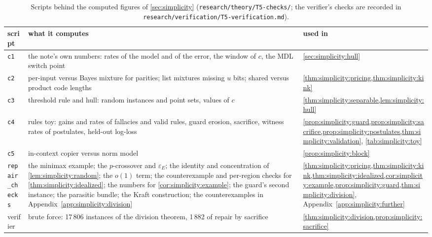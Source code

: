 \begin{table}[ht]
\centering\footnotesize
\begin{tabularx}{\textwidth}{@{}l>{\raggedright\arraybackslash}X>{\raggedright\arraybackslash}p{}@{}}
\toprule
script & what it computes & used in\\
\midrule
\texttt{c1} & the note's own numbers: rates of the model and of the error, the window of $c$, the MDL switch point & \cref{sec:simplicity:hull}\\
\texttt{c2} & per-input versus Bayes mixture for parities; list mixtures missing $u$ bits; shared versus product code lengths & \cref{thm:simplicity:pricing,thm:simplicity:kink}\\
\texttt{c3} & threshold rule and hull: random instances and point sets, values of $c$ & \cref{thm:simplicity:separable,lem:simplicity:hull}\\
\texttt{c4} & rules toy: gains and rates of fallacies and valid rules, guard erosion, sacrifice, witness rates of postulates, held-out log-loss & \cref{prop:simplicity:guard,prop:simplicity:sacrifice,prop:simplicity:postulates,thm:simplicity:validation}, \cref{tab:simplicity:toy}\\
\texttt{c5} & in-context copier versus norm model & \cref{prop:simplicity:block}\\
\texttt{repair\_checks} & the minimax example; the $p$-crossover and $\varepsilon_E$; the identity and concentration of \cref{lem:simplicity:random}; the $o(1)$ term; the counterexample and per-region checks for \cref{thm:simplicity:idealized}; the numbers for \cref{cor:simplicity:example}; the guard's second instance; the parasitic bundle; the Kraft construction; the counterexamples in Appendix~\ref{app:simplicity:division} & \cref{thm:simplicity:pricing,thm:simplicity:kink,thm:simplicity:idealized,cor:simplicity:example,prop:simplicity:guard,thm:simplicity:division}, Appendix~\ref{app:simplicity:further}\\
verifier & brute force: 17\,806 instances of the division theorem, 1\,882 of repair by sacrifice & \cref{thm:simplicity:division,prop:simplicity:sacrifice}\\
\bottomrule
\end{tabularx}
\caption{Scripts behind the \textsf{computed} figures of \cref{sec:simplicity} (\texttt{research/theory/T5-checks/}; the verifier's checks are recorded in \texttt{research/verification/T5-verification.md}).}
\label{tab:simplicity:scripts}
\end{table}

